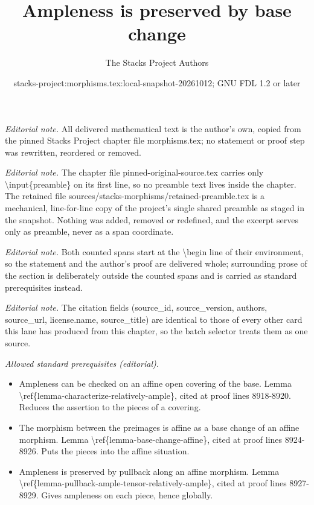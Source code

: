\documentclass[10pt,a4paper]{amsart}
\title{Ampleness is preserved by base change}
\author{The Stacks Project Authors}
\date{stacks-project:morphisms.tex:local-snapshot-20261012; GNU FDL 1.2 or later}
\theoremstyle{plain}
\theoremstyle{definition}
\theoremstyle{remark}
\numberwithin{equation}{subsection}
\begin{document}
\maketitle
\setcounter{subsection}{1}
\noindent\textit{Editorial note.} All delivered mathematical text is the author's own, copied from the pinned Stacks Project chapter file morphisms.tex; no statement or proof step was rewritten, reordered or removed.\par\medskip
\noindent\textit{Editorial note.} The chapter file pinned-original-source.tex carries only \textbackslash{}input\{preamble\} on its first line, so no preamble text lives inside the chapter. The retained file sources/stacks-morphisms/retained-preamble.tex is a mechanical, line-for-line copy of the project's single shared preamble as staged in the snapshot. Nothing was added, removed or redefined, and the excerpt serves only as preamble, never as a span coordinate.\par\medskip
\noindent\textit{Editorial note.} Both counted spans start at the \textbackslash{}begin line of their environment, so the statement and the author's proof are delivered whole; surrounding prose of the section is deliberately outside the counted spans and is carried as standard prerequisites instead.\par\medskip
\noindent\textit{Editorial note.} The citation fields (source\_id, source\_version, authors, source\_url, license.name, source\_title) are identical to those of every other card this lane has produced from this chapter, so the batch selector treats them as one source.\par\medskip
\noindent\textit{Allowed standard prerequisites (editorial).}\begin{itemize}
\item Ampleness can be checked on an affine open covering of the base. Lemma \textbackslash{}ref\{lemma-characterize-relatively-ample\}, cited at proof lines 8918-8920. Reduces the assertion to the pieces of a covering.
\item The morphism between the preimages is affine as a base change of an affine morphism. Lemma \textbackslash{}ref\{lemma-base-change-affine\}, cited at proof lines 8924-8926. Puts the pieces into the affine situation.
\item Ampleness is preserved by pullback along an affine morphism. Lemma \textbackslash{}ref\{lemma-pullback-ample-tensor-relatively-ample\}, cited at proof lines 8927-8929. Gives ampleness on each piece, hence globally.
\end{itemize}\medskip
\end{document}
